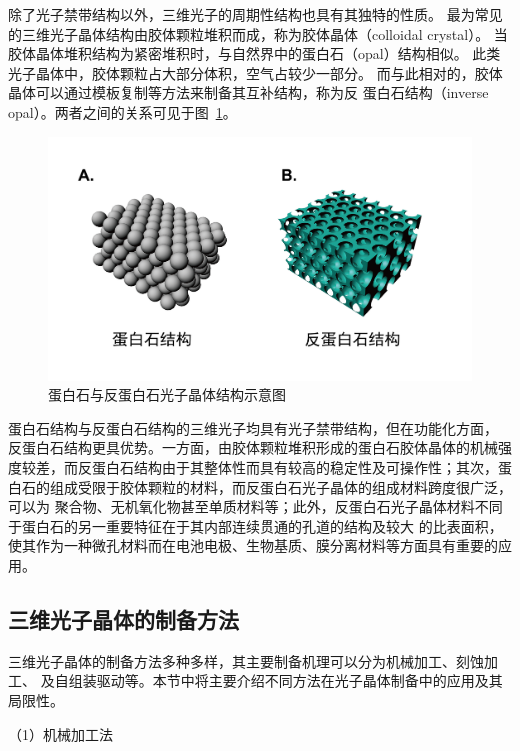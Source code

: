 除了光子禁带结构以外，三维光子的周期性结构也具有其独特的性质。
最为常见的三维光子晶体结构由胶体颗粒堆积而成，称为胶体晶体（colloidal crystal）。
当胶体晶体堆积结构为紧密堆积时，与自然界中的蛋白石（opal）结构相似。
此类光子晶体中，胶体颗粒占大部分体积，空气占较少一部分。
而与此相对的，胶体晶体可以通过模板复制等方法来制备其互补结构，称为反
蛋白石结构（inverse opal）。两者之间的关系可见于图~\ref{fig:opal_inv_opal}。
\begin{figure}[htbp]
	\centering
	\includegraphics[width=0.75\linewidth]{figures/opalvsinv.png}
	\caption{蛋白石与反蛋白石光子晶体结构示意图}
	\label{fig:opal_inv_opal}
\end{figure}
蛋白石结构与反蛋白石结构的三维光子均具有光子禁带结构，但在功能化方面，
反蛋白石结构更具优势。一方面，由胶体颗粒堆积形成的蛋白石胶体晶体的机械强度较差，而反蛋白石结构由于其整体性而具有较高的稳定性及可操作性；其次，蛋白石的组成受限于胶体颗粒的材料，而反蛋白石光子晶体的组成材料跨度很广泛，可以为
聚合物、无机氧化物甚至单质材料\cite{Meseguer2002Synthesis,Stein2013Design}等；此外，反蛋白石光子晶体材料不同于蛋白石的另一重要特征在于其内部连续贯通的孔道的结构及较大
的比表面积，使其作为一种微孔材料而在电池电极\cite{Kang2012Inverse,Zhou2014Photoelectrodes}、生物基质\cite{Lu2014Hybrid,Kim2014CellFriendly}、膜分离材料\cite{Kim2014Inverse,Kang2014LiquidImpermeable}等方面具有重要的应用。

\subsection{三维光子晶体的制备方法}
\label{subsec:3Dpreparation}
三维光子晶体的制备方法多种多样，其主要制备机理可以分为机械加工、刻蚀加工、
及自组装驱动等。本节中将主要介绍不同方法在光子晶体制备中的应用及其局限性。

（1）机械加工法

